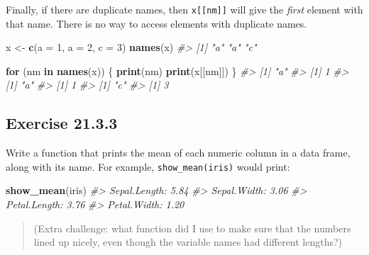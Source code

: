 \documentclass[]{book}
\newenvironment{Shaded}{\begin{snugshade}}{\end{snugshade}}
\newcommand{\CommentTok}[1]{\textcolor[rgb]{0.56,0.35,0.01}{\textit{#1}}}
\newcommand{\ControlFlowTok}[1]{\textcolor[rgb]{0.13,0.29,0.53}{\textbf{#1}}}
\newcommand{\DataTypeTok}[1]{\textcolor[rgb]{0.13,0.29,0.53}{#1}}
\newcommand{\DecValTok}[1]{\textcolor[rgb]{0.00,0.00,0.81}{#1}}
\newcommand{\KeywordTok}[1]{\textcolor[rgb]{0.13,0.29,0.53}{\textbf{#1}}}
\newcommand{\NormalTok}[1]{#1}
\newcommand{\StringTok}[1]{\textcolor[rgb]{0.31,0.60,0.02}{#1}}
\theoremstyle{plain}
\theoremstyle{remark}
\begin{document}
Finally, if there are duplicate names, then \texttt{x{[}{[}nm{]}{]}}
will give the \emph{first} element with that name. There is no way to
access elements with duplicate names.

\begin{Shaded}
\begin{Highlighting}[]
\NormalTok{x <-}\StringTok{ }\KeywordTok{c}\NormalTok{(}\DataTypeTok{a =} \DecValTok{1}\NormalTok{, }\DataTypeTok{a =} \DecValTok{2}\NormalTok{, }\DataTypeTok{c =} \DecValTok{3}\NormalTok{)}
\KeywordTok{names}\NormalTok{(x)}
\CommentTok{#> [1] "a" "a" "c"}
\end{Highlighting}
\end{Shaded}

\begin{Shaded}
\begin{Highlighting}[]
\ControlFlowTok{for}\NormalTok{ (nm }\ControlFlowTok{in} \KeywordTok{names}\NormalTok{(x)) \{}
  \KeywordTok{print}\NormalTok{(nm)}
  \KeywordTok{print}\NormalTok{(x[[nm]])}
\NormalTok{\}}
\CommentTok{#> [1] "a"}
\CommentTok{#> [1] 1}
\CommentTok{#> [1] "a"}
\CommentTok{#> [1] 1}
\CommentTok{#> [1] "c"}
\CommentTok{#> [1] 3}
\end{Highlighting}
\end{Shaded}

\hypertarget{exercise-21.3.3}{%
\subsection*{\texorpdfstring{Exercise
{21.3.3}}{Exercise 21.3.3}}\label{exercise-21.3.3}}

Write a function that prints the mean of each numeric column in a data
frame, along with its name. For example, \texttt{show\_mean(iris)} would
print:

\begin{Shaded}
\begin{Highlighting}[]
\KeywordTok{show_mean}\NormalTok{(iris)}
\CommentTok{#> Sepal.Length: 5.84}
\CommentTok{#> Sepal.Width:  3.06}
\CommentTok{#> Petal.Length: 3.76}
\CommentTok{#> Petal.Width:  1.20}
\end{Highlighting}
\end{Shaded}

\begin{quote}
(Extra challenge: what function did I use to make sure that the numbers
lined up nicely, even though the variable names had different lengths?)
\end{quote}
\end{document}
